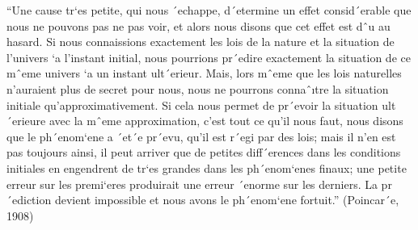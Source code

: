 \documentclass[12pt]{article}
\begin{document}
“Une cause tr`es petite, qui nous ´echappe, d´etermine un effet consid´erable
que nous ne pouvons pas ne pas voir, et alors nous disons que cet effet est
dˆu au hasard. Si nous connaissions exactement les lois de la nature et la
situation de l’univers `a l’instant initial, nous pourrions pr´edire exactement
la situation de ce mˆeme univers `a un instant ult´erieur. Mais, lors mˆeme
que les lois naturelles n’auraient plus de secret pour nous, nous ne pourrons
connaˆıtre la situation initiale qu’approximativement. Si cela nous permet
de pr´evoir la situation ult´erieure avec la mˆeme approximation, c’est tout ce
qu’il nous faut, nous disons que le ph´enom`ene a ´et´e pr´evu, qu’il est r´egi par
des lois; mais il n’en est pas toujours ainsi, il peut arriver que de petites
diff´erences dans les conditions initiales en engendrent de tr`es grandes dans
les ph´enom`enes finaux; une petite erreur sur les premi`eres produirait une
erreur ´enorme sur les derniers. La pr´ediction devient impossible et nous
avons le ph´enom`ene fortuit.” (Poincar´e, 1908)


\hfill
\end{document}

